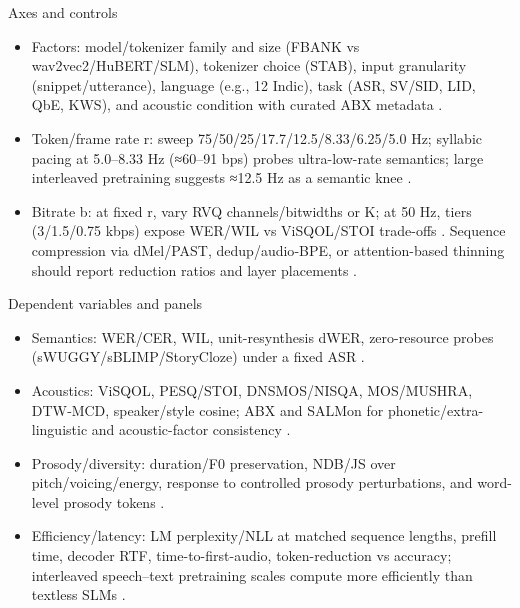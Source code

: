 \documentclass{article}
\begin{document}
Axes and controls
\begin{itemize}
  \item Factors: model/tokenizer family and size (FBANK vs wav2vec2/HuBERT/SLM), tokenizer choice (STAB), input granularity (snippet/utterance), language (e.g., 12 Indic), task (ASR, SV/SID, LID, QbE, KWS), and acoustic condition with curated ABX metadata \cite{poli2025fastabxlibraryefficientcomputationabxdis,vashishth2024stabspeechtokenizerassessmentbenchmark,fily2024establishingdegreesclosenessbetweenaudio,entry2025indicsuperbspeechprocessinguniversalperf,tian2025espnetspeechlmopenspeechlanguagemodeltoo}.
  \item Token/frame rate r: sweep 75/50/25/17.7/12.5/8.33/6.25/5.0 Hz; syllabic pacing at 5.0–8.33 Hz (≈60–91 bps) probes ultra-low-rate semantics; large interleaved pretraining suggests ≈12.5 Hz as a semantic knee \cite{baade2024syllablelmlearningcoarsesemanticunitsspe,zeng2024scalingspeechtextpretrainingsyntheticint}.
  \item Bitrate b: at fixed r, vary RVQ channels/bitwidths or K; at 50 Hz, tiers (3/1.5/0.75 kbps) expose WER/WIL vs ViSQOL/STOI trade-offs \cite{li2024investigatingneuralaudiocodecsspeechlang,ahasan2025dmcodecdistillingmultimodalrepresentatio}. Sequence compression via dMel/PAST, dedup/audio‑BPE, or attention-based thinning should report reduction ratios and layer placements \cite{bai2025dmelspeechtokenizationmadesimple,har-tuv2025pastphoneticacousticspeechtokenizer,min2025speechretrievalaugmentedgenerationwithou}.
\end{itemize}

Dependent variables and panels
\begin{itemize}
  \item Semantics: WER/CER, WIL, unit-resynthesis dWER, zero-resource probes (sWUGGY/sBLIMP/StoryCloze) under a fixed ASR \cite{li2024investigatingneuralaudiocodecsspeechlang}.
  \item Acoustics: ViSQOL, PESQ/STOI, DNSMOS/NISQA, MOS/MUSHRA, DTW‑MCD, speaker/style cosine; ABX and SALMon for phonetic/extra-linguistic and acoustic-factor consistency \cite{fily2024establishingdegreesclosenessbetweenaudio,maimon2025salmonsuiteacousticlanguagemodelevaluati,poli2025fastabxlibraryefficientcomputationabxdis}.
  \item Prosody/diversity: duration/F0 preservation, NDB/JS over pitch/voicing/energy, response to controlled prosody perturbations, and word-level prosody tokens \cite{qian2025prosodylmuncoveringemergingprosodyproces,onda2025benchmarkingprosodyencodingdiscretespeec}.
  \item Efficiency/latency: LM perplexity/NLL at matched sequence lengths, prefill time, decoder RTF, time-to-first-audio, token-reduction vs accuracy; interleaved speech–text pretraining scales compute more efficiently than textless SLMs \cite{maimon2025scalinganalysisinterleavedspeechtextlang,ma2025efficientspeechlanguagemodelingenergydis,vashishth2024stabspeechtokenizerassessmentbenchmark}.
\end{itemize}
\end{document}
